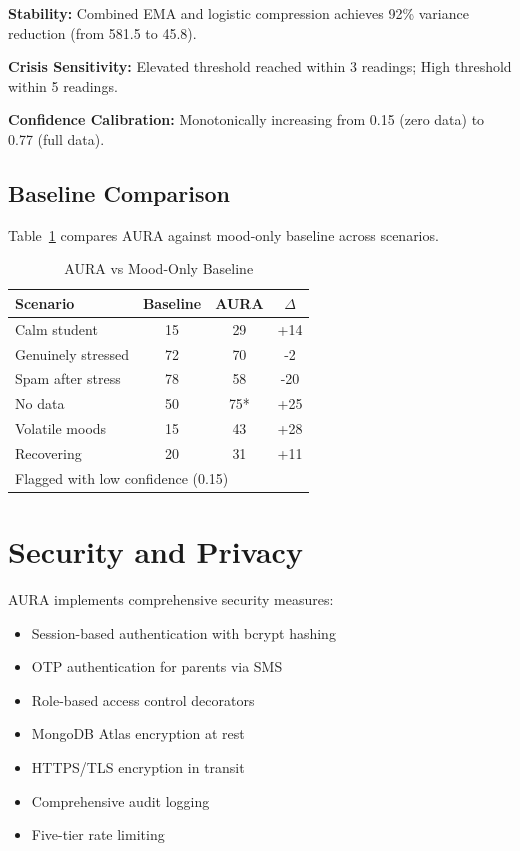 \documentclass[conference]{IEEEtran}
\begin{document}
\textbf{Stability:} Combined EMA and logistic compression achieves 92\% variance reduction (from 581.5 to 45.8).

\textbf{Crisis Sensitivity:} Elevated threshold reached within 3 readings; High threshold within 5 readings.

\textbf{Confidence Calibration:} Monotonically increasing from 0.15 (zero data) to 0.77 (full data).

\subsection{Baseline Comparison}

Table~\ref{tab:baseline} compares AURA against mood-only baseline across scenarios.

\begin{table}[htbp]
\caption{AURA vs Mood-Only Baseline}
\begin{center}
\begin{tabular}{|l|c|c|c|}
\hline
\textbf{Scenario} & \textbf{Baseline} & \textbf{AURA} & \textbf{$\Delta$} \\
\hline
Calm student & 15 & 29 & +14 \\
Genuinely stressed & 72 & 70 & -2 \\
Spam after stress & 78 & 58 & -20 \\
No data & 50 & 75* & +25 \\
Volatile moods & 15 & 43 & +28 \\
Recovering & 20 & 31 & +11 \\
\hline
\multicolumn{4}{l}{\small *Flagged with low confidence (0.15)}
\end{tabular}
\label{tab:baseline}
\end{center}
\end{table}

\section{Security and Privacy}

AURA implements comprehensive security measures:
\begin{itemize}
    \item Session-based authentication with bcrypt hashing
    \item OTP authentication for parents via SMS
    \item Role-based access control decorators
    \item MongoDB Atlas encryption at rest
    \item HTTPS/TLS encryption in transit
    \item Comprehensive audit logging
    \item Five-tier rate limiting
\end{itemize}
\end{document}
